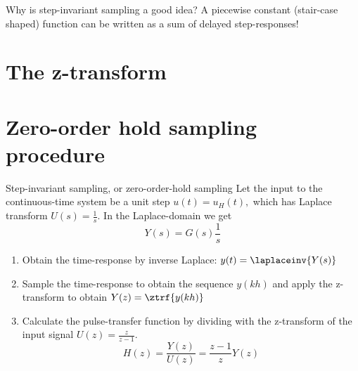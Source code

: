 \documentclass[presentation,aspectratio=169]{beamer}
\begin{document}
\begin{frame}[label={sec:org73d5760}]{Why is step-invariant sampling a good idea?}
A piecewise constant (stair-case shaped) function can be written as a sum of delayed step-responses!
\begin{center}
\end{center}
\end{frame}

\section{The z-transform}
\label{sec:org34fba72}

\section{Zero-order hold sampling procedure}
\label{sec:org452b0e5}
\begin{frame}[label={sec:orgd344fa3}]{Step-invariant sampling, or zero-order-hold sampling}
Let the input to the continuous-time system be a unit step \(u(t)=u_H(t),\) which has Laplace transform \(U(s)=\frac{1}{s}.\) In the Laplace-domain we get
\[Y(s) = G(s)\frac{1}{s}\]
\begin{enumerate}
\item Obtain the time-response by inverse Laplace: \(y(t)=\laplaceinv{Y(s)}\)
\item Sample the time-response to obtain the sequence \(y(kh)\) and apply  the z-transform to obtain \(Y(z) = \ztrf{y(kh)}\)
\item Calculate the pulse-transfer function by dividing with the z-transform of the input signal \(U(z) = \frac{z}{z-1}.\) \[H(z) = \frac{Y(z)}{U(z)} = \frac{z-1}{z}Y(z) \]
\end{enumerate}
\end{frame}
\end{document}
